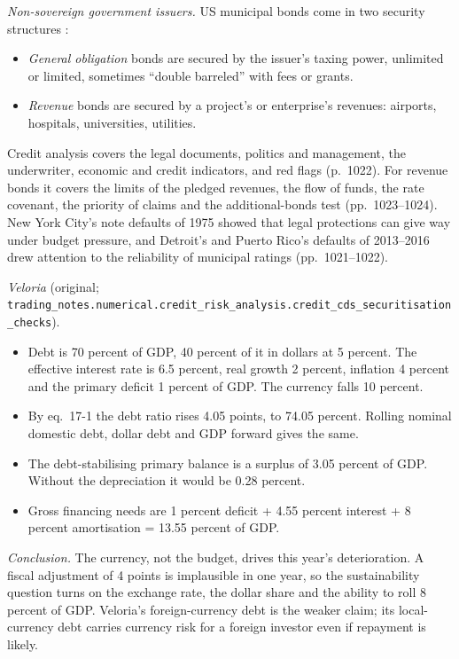 \begin{qfmethod}
\emph{Non-sovereign government issuers.} US municipal bonds come in two security structures \citep[pp.~206--207]{s7-fabozzifixed}:
\begin{itemize}
\item \emph{General obligation} bonds are secured by the issuer's taxing power, unlimited or limited, sometimes ``double barreled'' with fees or grants.
\item \emph{Revenue} bonds are secured by a project's or enterprise's revenues: airports, hospitals, universities, utilities.
\end{itemize}
Credit analysis covers the legal documents, politics and management, the underwriter, economic and credit indicators, and red flags (p.~1022). For revenue bonds it covers the limits of the pledged revenues, the flow of funds, the rate covenant, the priority of claims and the additional-bonds test (pp.~1023--1024). New York City's note defaults of 1975 showed that legal protections can give way under budget pressure, and Detroit's and Puerto Rico's defaults of 2013--2016 drew attention to the reliability of municipal ratings (pp.~1021--1022).

 \emph{Veloria} (original; \nolinkurl{trading_notes.numerical.credit_risk_analysis.credit_cds_securitisation_checks}).
\begin{itemize}
\item Debt is 70 percent of GDP, 40 percent of it in dollars at 5 percent. The effective interest rate is 6.5 percent, real growth 2 percent, inflation 4 percent and the primary deficit 1 percent of GDP. The currency falls 10 percent.
\item By eq.~17-1 the debt ratio rises 4.05 points, to 74.05 percent. Rolling nominal domestic debt, dollar debt and GDP forward gives the same.
\item The debt-stabilising primary balance is a surplus of 3.05 percent of GDP. Without the depreciation it would be 0.28 percent.
\item Gross financing needs are 1 percent deficit + 4.55 percent interest + 8 percent amortisation = 13.55 percent of GDP.
\end{itemize}
\emph{Conclusion.} The currency, not the budget, drives this year's deterioration. A fiscal adjustment of 4 points is implausible in one year, so the sustainability question turns on the exchange rate, the dollar share and the ability to roll 8 percent of GDP. Veloria's foreign-currency debt is the weaker claim; its local-currency debt carries currency risk for a foreign investor even if repayment is likely.


\end{qfmethod}
